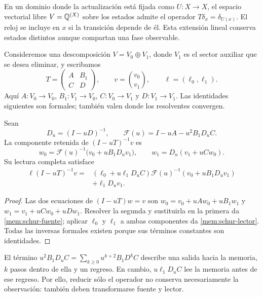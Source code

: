 En un dominio donde la actualización está fijada como \(U:X\to X\),
el espacio vectorial libre \(V=\mathbb Q^{(X)}\) sobre los estados admite el operador
\(T\delta_x=\delta_{U(x)}\). El reloj se incluye en \(x\) si la
transición depende de él. Esta extensión lineal conserva estados
distintos aunque compartan una fase observable.

Consideremos una descomposición \(V=V_0\oplus V_1\), donde \(V_1\)
es el sector auxiliar que se desea eliminar, y escribamos
\[
 T=\begin{pmatrix}A&B_1\\C&D\end{pmatrix},\qquad
 v=\binom{v_0}{v_1},\qquad \ell=(\ell_0,\ell_1).
\]
Aquí \(A:V_0\to V_0\), \(B_1:V_1\to V_0\),
\(C:V_0\to V_1\) y \(D:V_1\to V_1\).
Las identidades siguientes son formales; también valen donde los
resolventes convergen.

\begin{proposition}
\label{mem:prop-schur}
Sean
\[
 D_u=(I-uD)^{-1},\qquad
 \mathscr F(u)=I-uA-u^2B_1D_uC.
\]
La componente retenida de \((I-uT)^{-1}v\) es
\begin{equation}
 w_0=\mathscr F(u)^{-1}\bigl(v_0+uB_1D_uv_1\bigr),
 \qquad w_1=D_u(v_1+uCw_0).
 \label{mem:schur-fuente}
\end{equation}
Su lectura completa satisface
\begin{equation}
 \begin{split}
 \ell(I-uT)^{-1}v
 ={}&(\ell_0+u\ell_1D_uC)
       \mathscr F(u)^{-1}(v_0+uB_1D_uv_1)\\
    &+\ell_1D_uv_1.
 \end{split}
 \label{mem:schur-lector}
\end{equation}
\end{proposition}
\begin{proof}
Las dos ecuaciones de \((I-uT)w=v\) son
\(w_0=v_0+uAw_0+uB_1w_1\) y
\(w_1=v_1+uCw_0+uDw_1\).
Resolver la segunda y sustituirla en la primera da
\eqref{mem:schur-fuente}; aplicar \(\ell_0\) y \(\ell_1\)
a ambas componentes da \eqref{mem:schur-lector}.
Todas las inversas formales existen porque sus términos constantes
son identidades.
\end{proof}

El término \(u^2B_1D_uC=\sum_{k\geq0}u^{k+2}B_1D^kC\)
describe una salida hacia la memoria, \(k\) pasos dentro de ella y
un regreso. En cambio, \(u\ell_1D_uC\) lee la memoria antes de ese
regreso. Por ello, reducir sólo el operador no conserva necesariamente
la observación: también deben transformarse fuente y lector.


